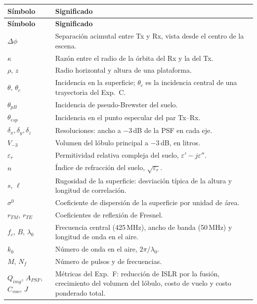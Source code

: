 \begin{longtable}{@{}L{2.8cm}L{11.6cm}@{}}
\toprule
\textbf{Símbolo} & \textbf{Significado} \\
\midrule
\endfirsthead
\toprule
\textbf{Símbolo} & \textbf{Significado} \\
\midrule
\endhead
$\Delta\phi$ & Separación acimutal entre Tx y Rx, vista desde el centro de la escena. \\
$\kappa$ & Razón entre el radio de la órbita del Rx y la del Tx. \\
$\rho$, $z$ & Radio horizontal y altura de una plataforma. \\
$\theta$, $\theta_c$ & Incidencia en la superficie; $\theta_c$ es la incidencia central de una
                       trayectoria del Exp.~C. \\
$\theta_{pB}$ & Incidencia de pseudo-Brewster del suelo. \\
$\theta_{esp}$ & Incidencia en el punto especular del par Tx--Rx. \\
$\delta_x,\delta_y,\delta_z$ & Resoluciones: ancho a $-3$\,dB de la PSF en cada eje. \\
$V_{-3}$ & Volumen del lóbulo principal a $-3$\,dB, en litros. \\
$\varepsilon_r$ & Permitividad relativa compleja del suelo, $\varepsilon'-j\varepsilon''$. \\
$n$ & Índice de refracción del suelo, $\sqrt{\varepsilon_r}$. \\
$s$, $\ell$ & Rugosidad de la superficie: desviación típica de la altura y longitud de correlación. \\
$\sigma^0$ & Coeficiente de dispersión de la superficie por unidad de área. \\
$r_{TM}$, $r_{TE}$ & Coeficientes de reflexión de Fresnel. \\
$f_c$, $B$, $\lambda_0$ & Frecuencia central (425\,MHz), ancho de banda (50\,MHz) y longitud de
                         onda en el aire. \\
$k_0$ & Número de onda en el aire, $2\pi/\lambda_0$. \\
$M$, $N_f$ & Número de pulsos y de frecuencias. \\
$Q_{img}$, $A_{PSF}$, $C_{voo}$, $J$ & Métricas del Exp.~F: reducción de ISLR por la fusión,
                                       crecimiento del volumen del lóbulo, costo de vuelo y costo
                                       ponderado total. \\
\bottomrule
\end{longtable}
